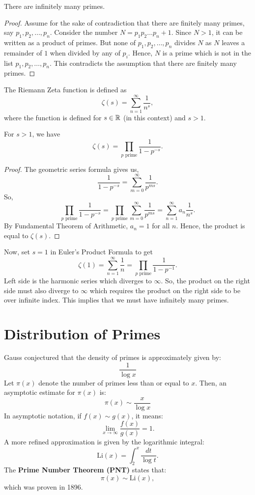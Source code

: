 \begin{theorem}
    There are infinitely many primes.
\end{theorem}
\begin{proof}
    Assume for the sake of contradiction that there are finitely many primes, say $p_1, p_2, \dots, p_n$. Consider the number $N = p_1p_2\dots p_n + 1$. Since $N > 1$, it can be written as a product of primes. But none of $p_1, p_2, \dots, p_n$ divides $N$ as $N$ leaves a remainder of $1$ when divided by any of $p_i$. Hence, $N$ is a prime which is not in the list $p_1, p_2, \dots, p_n$. This contradicts the assumption that there are finitely many primes.
\end{proof}
\begin{definition}
    The Riemann Zeta function is defined as
    \[\zeta(s) = \sum_{n=1}^{\infty} \frac{1}{n^s},\]
    where the function is defined for $s \in \mathbb{R}$ (in this context) and $s > 1$.
\end{definition}
\begin{theorem}
    For $s > 1$, we have
    \[\zeta(s) = \prod_{p \text{ prime}} \frac{1}{1-p^{-s}}.\]
\end{theorem}
\begin{proof}
    The geometric series formula gives us,
    \[\frac{1}{1-p^{-s}} = \sum_{m=0}^{\infty} \frac{1}{p^{ms}}.\]
    So,
    \[\prod_{p \text{ prime}} \frac{1}{1-p^{-s}} = \prod_{p \text{ prime}} \sum_{m=0}^{\infty} \frac{1}{p^{ms}} = \sum_{n=1}^{\infty} a_n \frac{1}{n^s}.\]
    By Fundamental Theorem of Arithmetic, $a_n = 1$ for all $n$. Hence, the product is equal to $\zeta(s)$.
\end{proof}
Now, set $s=1$ in Euler's Product Formula to get 
\[\zeta(1) = \sum_{n=1}^{\infty} \frac{1}{n} = \prod_{p \text{ prime}} \frac{1}{1-p^{-1}}.\]
Left side is the harmonic series which diverges to $\infty$. So, the product on the right side must also diverge to $\infty$ which requires the product on the right side to be over infinite index. This implies that we must have infinitely many primes.
\section{Distribution of Primes}
Gauss conjectured that the density of primes is approximately given by: 
\[
\frac{1}{\log x}
\]
Let \( \pi(x) \) denote the number of primes less than or equal to \( x \). Then, an asymptotic estimate for \( \pi(x) \) is: 
\[
\pi(x) \sim \frac{x}{\log x}
\]
In asymptotic notation, if \( f(x) \sim g(x) \), it means: 
\[
\lim_{x \to \infty} \frac{f(x)}{g(x)} = 1.
\]
A more refined approximation is given by the logarithmic integral: 
\[
\text{Li}(x) = \int_2^x \frac{dt}{\log t}.
\]
The \textbf{Prime Number Theorem (PNT)} states that: 
\[
\pi(x) \sim \text{Li}(x),
\]
which was proven in 1896.

